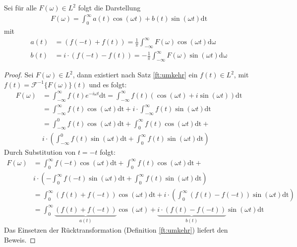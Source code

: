 \begin{lemma}\label{kkt:kor:cossin}
Sei für alle $F(\omega) \in L^2$ folgt die Darstellung
\begin{align}
	F(\omega) = \int_{0}^{\infty} a(t) \cos(\omega t)  +  b(t) \sin(\omega t) \mathrm{dt} 
\end{align} 
mit 
\begin{align}
	a(t) &= (f(-t) + f(t)) = \frac{1}{\pi} \int_{-\infty}^{\infty} F(\omega) \cos(\omega t) \mathrm{d\omega} \\
	b(t) &= i \cdot (f(-t) - f(t)) = -\frac{1}{\pi} \int_{-\infty}^{\infty} F(\omega) \sin(\omega t) \mathrm{d\omega}
\end{align}
\begin{proof}
Sei $F(\omega) \in L^2$, dann existiert nach Satz \ref{ft:umkehr} ein $f(t) \in L^2$, mit $f(t) = \mathscr{F}^{-1}\{F(\omega)\}(t)$ und es folgt: 
\begin{align}
	F(\omega) &= \int_{-\infty}^{\infty} f(t) e^{-i \omega t} \mathrm{dt}  = \int_{-\infty}^{\infty} f(t) (\cos(\omega t) + i \sin(\omega t)) \mathrm{dt}\\
	&= \int_{-\infty}^{\infty} f(t) \cos(\omega t) \mathrm{dt} + i \cdot \int_{-\infty}^{\infty} f(t) \sin(\omega t) \mathrm{dt}\\
	&= \int_{-\infty}^{0} f(t) \cos(\omega t) \mathrm{dt} + \int_{0}^{\infty} f(t) \cos(\omega t) \mathrm{dt} + \\
	&i \cdot \left( \int_{-\infty}^{0} f(t) \sin(\omega t) \mathrm{dt} + \int_{0}^{\infty} f(t) \sin(\omega t) \mathrm{dt} \right)
\end{align}
Durch Substitution von $t = -t$ folgt:
\begin{align}
	F(\omega) &= \int_{0}^{\infty} f(-t) \cos(\omega t) \mathrm{dt} + \int_{0}^{\infty} f(t) \cos(\omega t) \mathrm{dt} + \\
	&i \cdot \left( -\int_{0}^{\infty} f(-t) \sin(\omega t) \mathrm{dt} + \int_{0}^{\infty} f(t) \sin(\omega t) \mathrm{dt} \right) \\
	&= \int_{0}^{\infty} (f(t) + f(-t)) \cos(\omega t) \mathrm{dt} + i \cdot \left( \int_{0}^{\infty} (f(t) - f(-t)) \sin(\omega t) \mathrm{dt} \right) \\
	&= \int_{0}^{\infty} \underbrace{(f(t) + f(-t))}_{a(t)} \cos(\omega t)  + \underbrace{ i \cdot (f(t) - f(-t))}_{b(t)} \sin(\omega t) \mathrm{dt}
\end{align}
Das Einsetzen der Rücktransformation (Definition \ref{ft:umkehr}) liefert den Beweis.
\end{proof}
\end{lemma}
